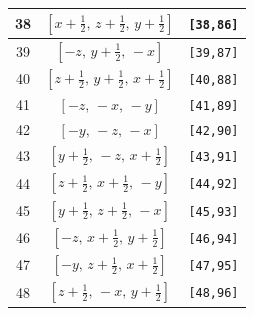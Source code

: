 \documentclass[fleqn,8pt]{jsarticle}
\begin{document}
\begin{longtable}{ccc}
38 & $\left[ x + \frac{1}{2},\, z + \frac{1}{2},\, y + \frac{1}{2} \right]$ & {\tt [38,86]} \\ \hline
39 & $\left[ - z,\, y + \frac{1}{2},\, - x \right]$ & {\tt [39,87]} \\ \hline
40 & $\left[ z + \frac{1}{2},\, y + \frac{1}{2},\, x + \frac{1}{2} \right]$ & {\tt [40,88]} \\ \hline
41 & $\left[ - z,\, - x,\, - y \right]$ & {\tt [41,89]} \\ \hline
42 & $\left[ - y,\, - z,\, - x \right]$ & {\tt [42,90]} \\ \hline
43 & $\left[ y + \frac{1}{2},\, - z,\, x + \frac{1}{2} \right]$ & {\tt [43,91]} \\ \hline
44 & $\left[ z + \frac{1}{2},\, x + \frac{1}{2},\, - y \right]$ & {\tt [44,92]} \\ \hline
45 & $\left[ y + \frac{1}{2},\, z + \frac{1}{2},\, - x \right]$ & {\tt [45,93]} \\ \hline
46 & $\left[ - z,\, x + \frac{1}{2},\, y + \frac{1}{2} \right]$ & {\tt [46,94]} \\ \hline
47 & $\left[ - y,\, z + \frac{1}{2},\, x + \frac{1}{2} \right]$ & {\tt [47,95]} \\ \hline
48 & $\left[ z + \frac{1}{2},\, - x,\, y + \frac{1}{2} \right]$ & {\tt [48,96]} \\
\end{longtable}
\end{document}
